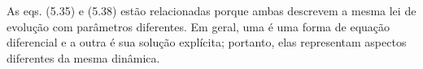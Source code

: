 As eqs. (5.35) e (5.38) estão relacionadas porque ambas descrevem a mesma lei de evolução com parâmetros diferentes. Em geral, uma é uma forma de equação diferencial e a outra é sua solução explícita; portanto, elas representam aspectos diferentes da mesma dinâmica. 